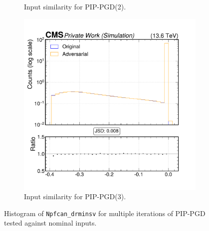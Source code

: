 \begin{figure}[h]
\begin{subfigure}[t]{0.32\textwidth}
    \caption*{Input similarity for PIP-PGD(2).}
  \end{subfigure}\hfill
  \begin{subfigure}[t]{0.32\textwidth}
    \includegraphics[width=\linewidth]{media/output/features/compare/combined_it_3/cmp_npf_arr_Npfcan_drminsv.pdf}
    \caption*{Input similarity for PIP-PGD(3).}
  \end{subfigure}

  \caption*{Histogram of \texttt{Npfcan\_drminsv} for multiple iterations of PIP-PGD tested against nominal inputs.}
  \label{fig:combined_input_Npfcan_drminsv}
\end{figure}

